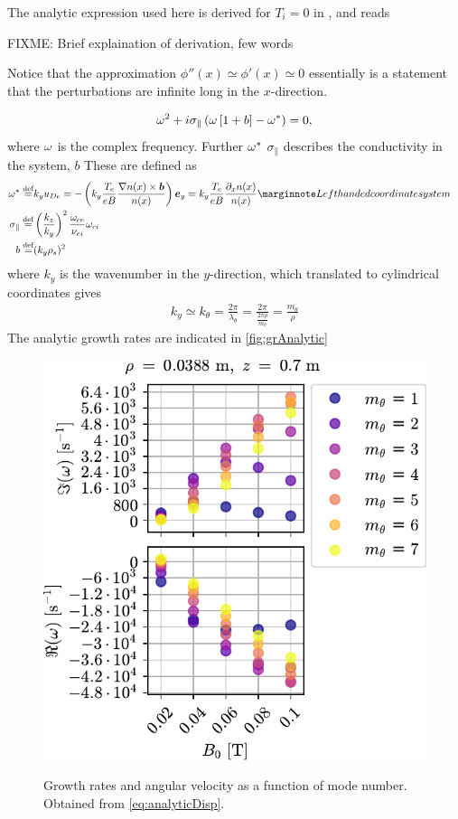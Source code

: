 The analytic expression used here is derived for $T_i=0$ in \cite{Pecseli2016book}, and reads

FIXME: Brief explaination of derivation, few words

Notice that the approximation $\phi''(x)\simeq\phi'(x)\simeq0$ essentially is a statement that the perturbations are infinite long in the $x$-direction.

%
\begin{align}
    \omega^2+i\sigma_\|\left(\omega\left[1+b\right]-\omega^*\right) = 0,
    \label{eq:analyticDisp}
\end{align}
%
where $\omega$ is the complex frequency.
Further $\omega^*$ $\sigma_\|$ describes the conductivity in the system, $b$
These are defined as
%
\begin{align*}
    \om^* \defined& k_y u_{De} =
    -\L(k_y \frac{T_e}{eB}\frac{\grad n(x)\times \ve{b}}{n(x)}\R)\ve{e}_y
    =
    k_y \frac{T_e}{eB}\frac{\partial_x n(x)}{n(x)}
    \note{Left handed coordinate system}
    \\
    \sigma_\| \defined& \L(\frac{k_z}{k_y}\R)^2 \frac{\om_{ce}}{\nu_{ei}}\om_{ci}\\
    b \defined& (k_y \rho_s)^2&
\end{align*}
%
where $k_y$ is the wavenumber in the $y$-direction, which translated to cylindrical coordinates gives
%
\begin{align*}
    k_y \simeq k_\theta
    = \frac{2\pi}{\lambda_\theta}
    = \frac{2\pi}{\frac{2\pi \rho}{m_\theta}}
    = \frac{m_\theta}{\rho}
\end{align*}
%
The analytic growth rates are indicated in \cref{fig:grAnalytic}
%
\begin{figure}
   \includegraphics{fig/results/growthRates/growthRatesAnalyticB0ModeNr}
   \label{fig:grAnalyticBModeNr}
    \caption{Growth rates and angular velocity as a function of mode number.
        Obtained from \cref{eq:analyticDisp}.}
\end{figure}
